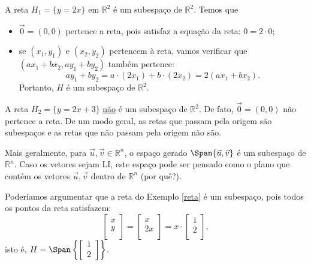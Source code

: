 \begin{ex}\label{reta}
	A reta $H_1 = \{y = 2x\}$ em $\mathbb{R}^2$ é um subespaço de $\mathbb{R}^2$. Temos que
	\begin{itemize}
		\item $\vec{0} = (0,0)$ pertence a reta, pois satisfaz a equação da reta: $0 = 2\cdot 0$;
		\item se $(x_1, y_1)$ e $(x_2, y_2)$ pertencem à reta, vamos verificar que $(ax_1 + b x_2, ay_1 + b y_2)$ também pertence:
		\begin{equation}
		ay_1 + b y_2 = a \cdot (2x_1) + b\cdot (2x_2) = 2 (ax_1 + b x_2).
		\end{equation} Portanto, $H$ é um subespaço de $\mathbb{R}^2$.
	\end{itemize}
\end{ex}

\begin{ex}
	A reta $H_2 = \{y = 2x + 3\}$ \underline{não} é um subespaço de $\mathbb{R}^2$. De fato, $\vec{0} = (0,0)$ não pertence a reta. De um modo geral, as retas que passam pela origem são subespaços e as retas que não passam pela origem não são.
\end{ex}


\begin{ex}
	Mais geralmente, para $\vec{u}, \vec{v} \in \mathbb{R}^n$, o espaço gerado $\Span \{\vec{u}, \vec{v}\}$ é um subespaço de $\mathbb{R}^n$. Caso os vetores sejam LI, este espaço pode ser pensado como o plano que contém os vetores $\vec{u}, \vec{v}$ dentro de $\mathbb{R}^n$ (por quê?).

	Poderíamos argumentar que a reta do Exemplo \ref{reta} é um subespaço, pois todos os pontos da reta satisfazem:
	\begin{equation}
	\left[
	\begin{array}{c}
	x \\
	y \\
	\end{array}
	\right] =
	\left[
	\begin{array}{c}
	x \\
	2x \\
	\end{array}
	\right] = x \cdot
	\left[
	\begin{array}{c}
	1 \\
	2 \\
	\end{array}
	\right],
	\end{equation} isto é, $H = \Span \left\{ \left[
	\begin{array}{c}
	1 \\
	2 \\
	\end{array}
	\right] \right\}$.
\end{ex}


